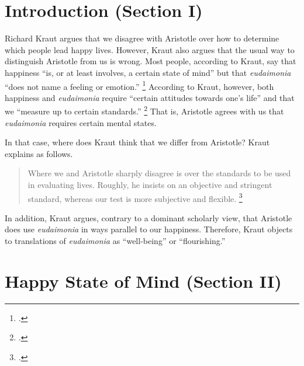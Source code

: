 \documentclass[12pt,letterpaper]{article}
\begin{document}

\pagestyle{notes}

\section*{Introduction (Section I)}

Richard Kraut argues that we disagree with Aristotle over how to determine which people lead happy lives.
However, Kraut also argues that the usual way to distinguish Aristotle from us is wrong.
Most people, according to Kraut, say that happiness ``is, or at least involves, a certain state of mind'' but that \textit{eudaimonia} ``does not name a feeling or emotion.''%
\footcite[][167]{two-conceptions-of-happiness-kraut-1979}
According to Kraut, however, both happiness and \textit{eudaimonia} require ``certain attitudes towards one's life'' and that we ``measure up to certain standards.''%
\footcite[][197]{two-conceptions-of-happiness-kraut-1979}
That is, Aristotle agrees with us that \textit{eudaimonia} requires certain mental states.

In that case, where does Kraut think that we differ from Aristotle? Kraut explains as follows.

\begin{quote}
    Where we and Aristotle sharply disagree is over the standards to be used in evaluating lives.
    Roughly, he insists on an objective and stringent standard, whereas our test is more subjective and flexible.%
    \footcite[][197]{two-conceptions-of-happiness-kraut-1979}
\end{quote}

In addition, Kraut argues, contrary to a dominant scholarly view, that Aristotle does use \textit{eudaimonia} in ways parallel to our happiness.
Therefore, Kraut objects to translations of \textit{eudaimonia} as ``well-being'' or ``flourishing.''

\section*{Happy State of Mind (Section II)}
\end{document}
